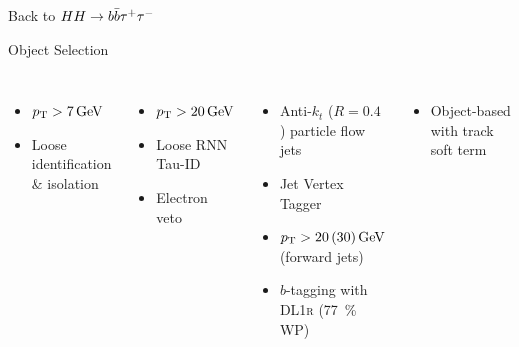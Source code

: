 \documentclass[11pt, xcolor={dvipsnames}, aspectratio=169]{beamer}
\begin{document}

\begin{frame}[standout]
  Back to $HH \rightarrow b\bar{b}\tau^+\tau^-$
\end{frame}


\begin{frame}{Object Selection}
  \begin{columns}[onlytextwidth]

    \begin{itemize}
    \item $\pT > \SI{7}{\GeV}$
    \item Loose identification \& isolation
    \end{itemize}

    \vspace*{1em}

    \allbold{\tauhadvis:}
    \begin{itemize}
    \item $\pT > \SI{20}{\GeV}$
    \item Loose RNN Tau-ID
    \item Electron veto
    \end{itemize}


    \begin{itemize}
    \item Anti-$k_{t}$ ($R = 0.4$) particle flow jets
    \item Jet Vertex Tagger
    \item $\pT > \num{20} \, (\num{30})\,\si{\GeV}$ (forward jets)
    \item $b$-tagging with \textsc{DL1r} (\SI{77}{\percent} WP)
    \end{itemize}

    \vspace*{1em}

    \allbold{\pTmissAbs:}
    \begin{itemize}
    \item Object-based with track soft term
    \end{itemize}
  \end{columns}

\end{frame}
\end{document}
